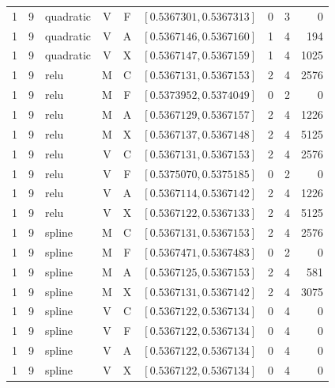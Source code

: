 \begin{longtable}{r r l c c l r r r}
1 & 9 & quadratic & V & F & $[0.5367301,0.5367313]$ & 0 & 3 & 0 \\
1 & 9 & quadratic & V & A & $[0.5367146,0.5367160]$ & 1 & 4 & 194 \\
1 & 9 & quadratic & V & X & $[0.5367147,0.5367159]$ & 1 & 4 & 1025 \\
1 & 9 & relu & M & C & $[0.5367131,0.5367153]$ & 2 & 4 & 2576 \\
1 & 9 & relu & M & F & $[0.5373952,0.5374049]$ & 0 & 2 & 0 \\
1 & 9 & relu & M & A & $[0.5367129,0.5367157]$ & 2 & 4 & 1226 \\
1 & 9 & relu & M & X & $[0.5367137,0.5367148]$ & 2 & 4 & 5125 \\
1 & 9 & relu & V & C & $[0.5367131,0.5367153]$ & 2 & 4 & 2576 \\
1 & 9 & relu & V & F & $[0.5375070,0.5375185]$ & 0 & 2 & 0 \\
1 & 9 & relu & V & A & $[0.5367114,0.5367142]$ & 2 & 4 & 1226 \\
1 & 9 & relu & V & X & $[0.5367122,0.5367133]$ & 2 & 4 & 5125 \\
1 & 9 & spline & M & C & $[0.5367131,0.5367153]$ & 2 & 4 & 2576 \\
1 & 9 & spline & M & F & $[0.5367471,0.5367483]$ & 0 & 2 & 0 \\
1 & 9 & spline & M & A & $[0.5367125,0.5367153]$ & 2 & 4 & 581 \\
1 & 9 & spline & M & X & $[0.5367131,0.5367142]$ & 2 & 4 & 3075 \\
1 & 9 & spline & V & C & $[0.5367122,0.5367134]$ & 0 & 4 & 0 \\
1 & 9 & spline & V & F & $[0.5367122,0.5367134]$ & 0 & 4 & 0 \\
1 & 9 & spline & V & A & $[0.5367122,0.5367134]$ & 0 & 4 & 0 \\
1 & 9 & spline & V & X & $[0.5367122,0.5367134]$ & 0 & 4 & 0 \\
\hline\end{longtable}\endgroup
